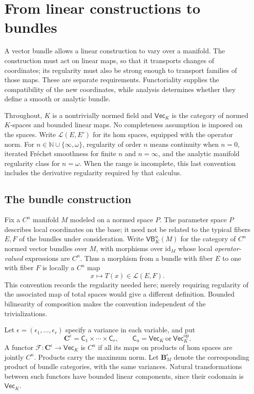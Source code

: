 \documentclass[11pt]{amsart}
\theoremstyle{definition}
\theoremstyle{remark}
\numberwithin{equation}{section}
\newcommand{\N}{\mathbb N}
\newcommand{\cL}{\mathcal L}
\newcommand{\id}{\mathrm{id}}
\begin{document}
\section{From linear constructions to bundles}\label{sec:bundles}

A vector bundle allows a linear construction to vary over a manifold. The construction must act on linear maps, so that it transports changes of coordinates; its regularity must also be strong enough to transport families of those maps. These are separate requirements. Functoriality supplies the compatibility of the new coordinates, while analysis determines whether they define a smooth or analytic bundle.

Throughout, $K$ is a nontrivially normed field and $\mathsf{Vec}_K$ is the category of normed $K$-spaces and bounded linear maps. No completeness assumption is imposed on the spaces. Write $\cL(E,E')$ for its hom spaces, equipped with the operator norm. For $n\in\N\cup\{\infty,\omega\}$, regularity of order $n$ means continuity when $n=0$, iterated Fr\'echet smoothness for finite $n$ and $n=\infty$, and the analytic manifold regularity class for $n=\omega$. When the range is incomplete, this last convention includes the derivative regularity required by that calculus.

\subsection{The bundle construction}

Fix a $C^n$ manifold $M$ modeled on a normed space $P$. The parameter space $P$ describes local coordinates on the base; it need not be related to the typical fibers $E,F$ of the bundles under consideration. Write $\mathsf{VB}^n_K(M)$ for the category of $C^n$ normed vector bundles over $M$, with morphisms over $\id_M$ whose local \emph{operator-valued} expressions are $C^n$. Thus a morphism from a bundle with fiber $E$ to one with fiber $F$ is locally a $C^n$ map
\[
 x\longmapsto T(x)\in\cL(E,F).
\]
This convention records the regularity needed here; merely requiring regularity of the associated map of total spaces would give a different definition. Bounded bilinearity of composition makes the convention independent of the trivializations.

Let $\epsilon=(\epsilon_1,\ldots,\epsilon_r)$ specify a variance in each variable, and put
\[
 \mathbf C^\epsilon=\mathsf C_1\times\cdots\times\mathsf C_r,
 \qquad
 \mathsf C_a=\mathsf{Vec}_K\ \text{or}\ \mathsf{Vec}_K^{\mathrm{op}}.
\]
A functor $\mathcal F\colon\mathbf C^\epsilon\to\mathsf{Vec}_K$ is $C^n$ if all its maps on products of hom spaces are jointly $C^n$. Products carry the maximum norm. Let $\mathbf B^\epsilon_M$ denote the corresponding product of bundle categories, with the same variances. Natural transformations between such functors have bounded linear components, since their codomain is $\mathsf{Vec}_K$.
\end{document}
